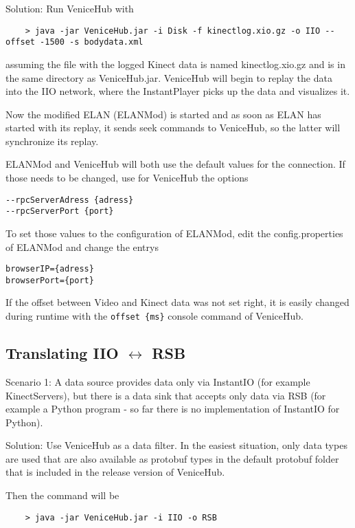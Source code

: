 \documentclass[german,a4paper]{article}
\begin{document}
Solution: Run VeniceHub with
\begin{lstlisting}
    > java -jar VeniceHub.jar -i Disk -f kinectlog.xio.gz -o IIO --offset -1500 -s bodydata.xml
\end{lstlisting}
assuming the file with the logged Kinect data is named kinectlog.xio.gz and is in the same directory as VeniceHub.jar. VeniceHub will begin to replay the data into the IIO network, where the InstantPlayer picks up the data and visualizes it.

Now the modified ELAN (ELANMod) is started and as soon as ELAN has started with its replay, it sends seek commands to VeniceHub, so the latter will synchronize its replay.

ELANMod and VeniceHub will both use the default values for the connection. If those needs to be changed, use for VeniceHub the options
\begin{lstlisting}
--rpcServerAdress {adress}
--rpcServerPort {port}
\end{lstlisting}

To set those values to the configuration of ELANMod, edit the config.properties of ELANMod and change the entrys
\begin{lstlisting}
browserIP={adress}
browserPort={port}
\end{lstlisting}

If the offset between Video and Kinect data was not set right, it is easily changed during runtime with the \texttt{offset \{ms\}} console command of VeniceHub.

\subsection{Translating IIO $\leftrightarrow$ RSB}

Scenario 1: A data source provides data only via InstantIO (for example KinectServers), but there is a data sink that accepts only data via RSB (for example a Python program - so far there is no implementation of InstantIO for Python).

Solution: Use VeniceHub as a data filter. In the easiest situation, only data types are used that are also available as protobuf types in the default protobuf folder that is included in the release version of VeniceHub.

Then the command will be
\begin{lstlisting}
    > java -jar VeniceHub.jar -i IIO -o RSB
\end{lstlisting}
\end{document}
